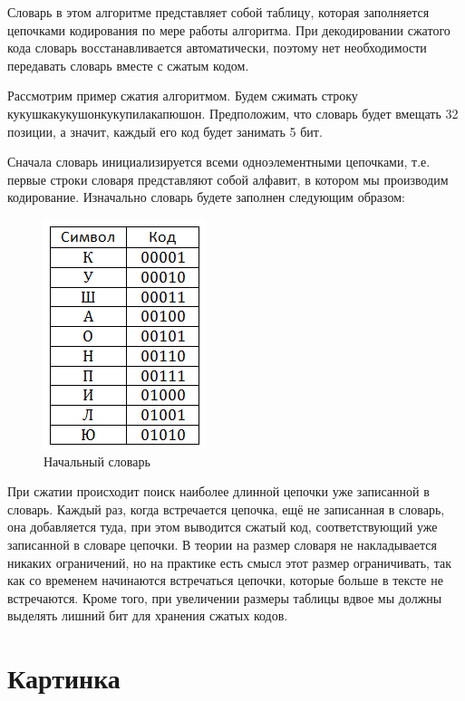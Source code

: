 Словарь в этом алгоритме представляет собой таблицу, которая заполняется цепочками кодирования по мере работы алгоритма. При декодировании сжатого кода словарь восстанавливается автоматически, поэтому нет необходимости передавать словарь вместе с сжатым кодом. 

Рассмотрим пример сжатия алгоритмом. Будем сжимать строку кукушкакукушонкукупилакапюшон. Предположим, что словарь будет вмещать 32 позиции, а значит, каждый его код будет занимать 5 бит.

Сначала словарь инициализируется всеми одноэлементными цепочками, т.е. первые строки словаря представляют собой алфавит, в котором мы производим кодирование. Изначально словарь будете заполнен следующим образом:

\begin{figure}[H]
	\begin{center}
		\includegraphics[scale=1]{pics/LZW/dictionary.png}
		\caption{Начальный словарь} 
		\label{pic:lzw:dictionary}
	\end{center}
\end{figure}

 При сжатии происходит поиск наиболее длинной цепочки уже записанной в словарь. Каждый раз, когда встречается цепочка, ещё не записанная в словарь, она добавляется туда, при этом выводится сжатый код, соответствующий уже записанной в словаре цепочки. 
В теории на размер словаря не накладывается никаких ограничений, но на практике есть смысл этот размер ограничивать, так как со временем начинаются встречаться цепочки, которые больше в тексте не встречаются. Кроме того, при увеличении размеры таблицы вдвое мы должны выделять лишний бит для хранения сжатых кодов.
  

\section*{Картинка}

